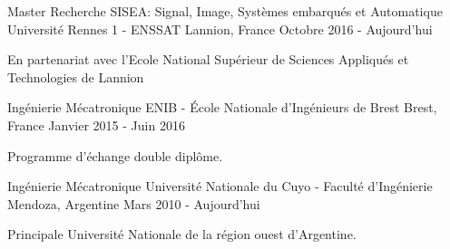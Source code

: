
\begin{cventries}

\cventry
{Master Recherche SISEA: Signal, Image, Systèmes embarqués et Automatique} %
{Université Rennes 1 - ENSSAT }
{Lannion, France} %
{Octobre 2016 - Aujourd'hui} %
{
	\begin{cvitems} %
		\item {En partenariat avec l'Ecole National Supérieur de Sciences Appliqués et Technologies de Lannion}
	\end{cvitems}
}
\cventry
{Ingénierie Mécatronique} %
{ENIB - École Nationale d'Ingénieurs de Brest} %
{Brest, France} %
{Janvier 2015 - Juin 2016} %
{
  \begin{cvitems} %
    \item {Programme d'échange double diplôme.}
  \end{cvitems}
}

\cventry
{Ingénierie Mécatronique} %
{Université Nationale du Cuyo - Faculté d'Ingénierie} %
{Mendoza, Argentine} %
{Mars 2010 - Aujourd'hui} %
{
	\begin{cvitems} %
		\item {Principale Université Nationale de la région ouest d'Argentine.}
	\end{cvitems}
}








\end{cventries}
